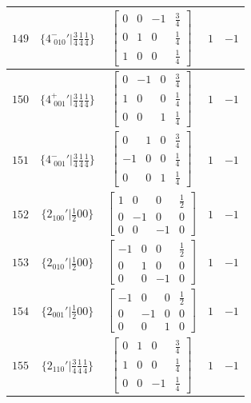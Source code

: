 \documentclass[fleqn,8pt]{jsarticle}
\begin{document}
\begin{longtable}{ccccc}
$ 149 $ & $ \{4^{-}_{\,\,010}{}'|\frac{3}{4} \frac{1}{4} \frac{1}{4}\} $ & $ \begin{bmatrix} 0 & 0 & -1 & \frac{3}{4} \\ 0 & 1 & 0 & \frac{1}{4} \\ 1 & 0 & 0 & \frac{1}{4} \end{bmatrix} $ & $ 1 $ & $ -1 $ \\ \hline
$ 150 $ & $ \{4^{+}_{\,\,001}{}'|\frac{3}{4} \frac{1}{4} \frac{1}{4}\} $ & $ \begin{bmatrix} 0 & -1 & 0 & \frac{3}{4} \\ 1 & 0 & 0 & \frac{1}{4} \\ 0 & 0 & 1 & \frac{1}{4} \end{bmatrix} $ & $ 1 $ & $ -1 $ \\ \hline
$ 151 $ & $ \{4^{-}_{\,\,001}{}'|\frac{3}{4} \frac{1}{4} \frac{1}{4}\} $ & $ \begin{bmatrix} 0 & 1 & 0 & \frac{3}{4} \\ -1 & 0 & 0 & \frac{1}{4} \\ 0 & 0 & 1 & \frac{1}{4} \end{bmatrix} $ & $ 1 $ & $ -1 $ \\ \hline
$ 152 $ & $ \{2{}_{100}{}'|\frac{1}{2} 0 0\} $ & $ \begin{bmatrix} 1 & 0 & 0 & \frac{1}{2} \\ 0 & -1 & 0 & 0 \\ 0 & 0 & -1 & 0 \end{bmatrix} $ & $ 1 $ & $ -1 $ \\ \hline
$ 153 $ & $ \{2{}_{010}{}'|\frac{1}{2} 0 0\} $ & $ \begin{bmatrix} -1 & 0 & 0 & \frac{1}{2} \\ 0 & 1 & 0 & 0 \\ 0 & 0 & -1 & 0 \end{bmatrix} $ & $ 1 $ & $ -1 $ \\ \hline
$ 154 $ & $ \{2{}_{001}{}'|\frac{1}{2} 0 0\} $ & $ \begin{bmatrix} -1 & 0 & 0 & \frac{1}{2} \\ 0 & -1 & 0 & 0 \\ 0 & 0 & 1 & 0 \end{bmatrix} $ & $ 1 $ & $ -1 $ \\ \hline
$ 155 $ & $ \{2{}_{110}{}'|\frac{3}{4} \frac{1}{4} \frac{1}{4}\} $ & $ \begin{bmatrix} 0 & 1 & 0 & \frac{3}{4} \\ 1 & 0 & 0 & \frac{1}{4} \\ 0 & 0 & -1 & \frac{1}{4} \end{bmatrix} $ & $ 1 $ & $ -1 $ \\ \hline

\end{longtable}
\end{document}
